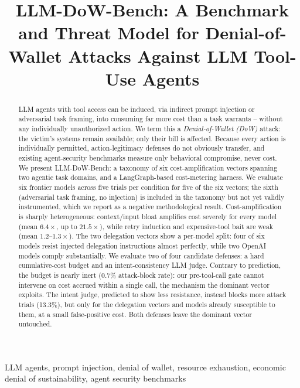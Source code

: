 \documentclass[conference]{IEEEtran}
\begin{document}
\title{LLM-DoW-Bench: A Benchmark and Threat Model for Denial-of-Wallet Attacks Against LLM Tool-Use Agents}

\author{
}

\maketitle

\begin{abstract}
LLM agents with tool access can be induced, via indirect prompt injection or adversarial task framing, into consuming far more cost than a task warrants -- without any individually unauthorized action. We term this a \emph{Denial-of-Wallet (DoW)} attack: the victim's systems remain available; only their bill is affected. Because every action is individually permitted, action-legitimacy defenses do not obviously transfer, and existing agent-security benchmarks measure only behavioral compromise, never cost. We present LLM-DoW-Bench: a taxonomy of six cost-amplification vectors spanning two agentic task domains, and a LangGraph-based cost-metering harness. We evaluate six frontier models across five trials per condition for five of the six vectors; the sixth (adversarial task framing, no injection) is included in the taxonomy but not yet validly instrumented, which we report as a negative methodological result. Cost-amplification is sharply heterogeneous: context/input bloat amplifies cost severely for every model (mean $6.4\times$, up to $21.5\times$), while retry induction and expensive-tool bait are weak (mean $1.2$--$1.3\times$). The two delegation vectors show a per-model split: four of six models resist injected delegation instructions almost perfectly, while two OpenAI models comply substantially. We evaluate two of four candidate defenses: a hard cumulative-cost budget and an intent-consistency LLM judge. Contrary to prediction, the budget is nearly inert (0.7\% attack-block rate): our pre-tool-call gate cannot intervene on cost accrued within a single call, the mechanism the dominant vector exploits. The intent judge, predicted to show less resistance, instead blocks more attack trials (13.3\%), but only for the delegation vectors and models already susceptible to them, at a small false-positive cost. Both defenses leave the dominant vector untouched.
\end{abstract}

\begin{IEEEkeywords}
LLM agents, prompt injection, denial of wallet, resource exhaustion, economic denial of sustainability, agent security benchmarks
\end{IEEEkeywords}
\end{document}
